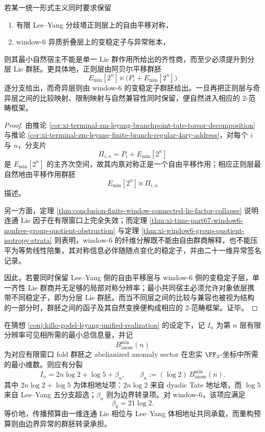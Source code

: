 \begin{proposition}\label{prop:conclusion-minimal-stratified-lie-groupoid-lift}
若某一统一形式主义同时要求保留
\begin{enumerate}
  \item 有限 Lee--Yang 分歧塔正则层上的自由平移对称，
  \item window-\(6\) 异质折叠层上的变稳定子与异常账本，
\end{enumerate}
则其最小自然宿主不能是单一 Lie 群作用所给出的齐性商，而至少必须提升到分层 Lie 群胚。更具体地，正则层由阿贝尔平移群胚
\[
E_{\min}[2^n]\ltimes \bigl(P_i+E_{\min}[2^n]\bigr)
\]
逐分支给出，而奇异层则由 window-\(6\) 的变稳定子群胚给出。一旦再把正则层与奇异层之间的比较映射、限制映射与自然兼容性同时保留，便自然进入相应的 \(2\)-范畴框架。
\end{proposition}
\begin{proof}
由推论 \ref{cor:xi-terminal-zm-leyang-branchpoint-tate-torsor-decomposition} 与推论 \ref{cor:xi-terminal-zm-leyang-finite-branch-regular-4ary-address}，对每个 \(i\) 与 \(n\)，分支片
\[
\Pi_{i,n}=P_i+E_{\min}[2^n]
\]
是 \(E_{\min}[2^n]\) 的主齐次空间，故其内禀对称正是一个自由平移作用；相应正则层最自然地由平移作用群胚
\[
E_{\min}[2^n]\ltimes \Pi_{i,n}
\]
描述。

另一方面，定理 \ref{thm:conclusion-finite-window-connected-lie-factor-collapse} 说明连通 Lie 因子在有限窗口上完全失效；而定理 \ref{thm:xi-time-part67-window6-nonfree-group-quotient-obstruction} 与定理 \ref{thm:xi-window6-group-quotient-isotropy-strata} 则表明，window-\(6\) 的纤维分解既不能由自由群商解释，也不能压平为等势线性陪集，其对称信息必伴随随点变化的稳定子，并由二十一维异常签名记录。

因此，若要同时保留 Lee--Yang 侧的自由平移层与 window-\(6\) 侧的变稳定子层，单一齐性 Lie 群商并无足够的局部对称分辨率；最小共同宿主必须允许对象依层携带不同稳定子，即为分层 Lie 群胚。而当不同层之间的比较与兼容也被视为结构的一部分时，群胚之间的函子及其自然变换便构成相应的 \(2\)-范畴框架。证毕。
\end{proof}

\begin{conjecture}[边界转录与体相地址的分裂原理]\label{conj:conclusion-boundary-transcription-body-address-splitting}
在猜想 \ref{conj:killo-godel-leyang-unified-realization} 的设定下，记 \(I_n\) 为第 \(n\) 层有限分辨率可见相所需的最小总信息量，并记
\[
B_{\mathrm{anom}}^{\min}(n)
\]
为对应有限窗口 fold 群胚之 abelianized anomaly sector 在忠实 \(\FF_2\)-坐标中所需的最小维数。则应有分裂
\[
I_n=2n\log 2+\log 5+\beta_n,
\qquad
\beta_n:=(\log 2)\,B_{\mathrm{anom}}^{\min}(n).
\]
其中 \(2n\log 2+\log 5\) 为体相地址项：\(2n\log 2\) 来自 dyadic Tate 地址塔，而 \(\log 5\) 来自 Lee--Yang 五分支超选；\(\beta_n\) 则为边界转录项。对 window-\(6\)，该项应满足
\[
\beta_6=21\log 2.
\]
等价地，传播预算由一维连通 Lie 相位与 Lee--Yang 体相地址共同承载，而重构预算则由边界异常的群胚转录承担。
\end{conjecture}

